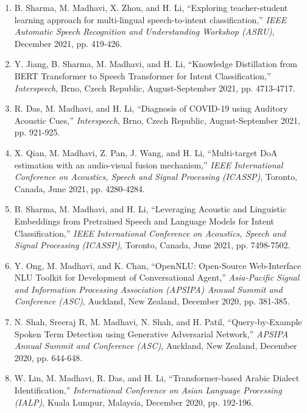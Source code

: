 \documentclass[10pt]{article}
\begin{document}
\begin{enumerate}[resume]
\item B. Sharma, M. Madhavi, X. Zhou, and H. Li, ``Exploring teacher-student learning approach for multi-lingual speech-to-intent classification,'' \textit{IEEE Automatic Speech Recognition and Understanding Workshop (ASRU)}, December 2021, pp. 419-426.

\item Y. Jiang, B. Sharma, M. Madhavi, and H. Li, ``Knowledge Distillation from BERT Transformer to Speech Transformer for Intent Classification,'' \textit{Interspeech}, Brno, Czech Republic, August-September 2021, pp. 4713-4717.

\item R. Das, M. Madhavi, and H. Li, ``Diagnosis of COVID-19 using Auditory Acoustic Cues,'' \textit{Interspeech}, Brno, Czech Republic, August-September 2021, pp. 921-925.

\item X. Qian, M. Madhavi, Z. Pan, J. Wang, and H. Li, ``Multi-target DoA estimation with an audio-visual fusion mechanism,'' \textit{IEEE International Conference on Acoustics, Speech and Signal Processing (ICASSP)}, Toronto, Canada, June 2021, pp. 4280-4284.

\item B. Sharma, M. Madhavi, and H. Li, ``Leveraging Acoustic and Linguistic Embeddings from Pretrained Speech and Language Models for Intent Classification,'' \textit{IEEE International Conference on Acoustics, Speech and Signal Processing (ICASSP)}, Toronto, Canada, June 2021, pp. 7498-7502.

\item Y. Ong, M. Madhavi, and K. Chan, ``OpenNLU: Open-Source Web-Interface NLU Toolkit for Development of Conversational Agent,'' \textit{Asia-Pacific Signal and Information Processing Association (APSIPA) Annual Summit and Conference (ASC)}, Auckland, New Zealand, December 2020, pp. 381-385.

\item N. Shah, Sreeraj R, M. Madhavi, N. Shah, and H. Patil, ``Query-by-Example Spoken Term Detection using Generative Adversarial Network,'' \textit{APSIPA Annual Summit and Conference (ASC)}, Auckland, New Zealand, December 2020, pp. 644-648.

\item W. Lin, M. Madhavi, R. Das, and H. Li, ``Transformer-based Arabic Dialect Identification,'' \textit{International Conference on Asian Language Processing (IALP)}, Kuala Lumpur, Malaysia, December 2020, pp. 192-196.


\end{enumerate}
\end{document}
